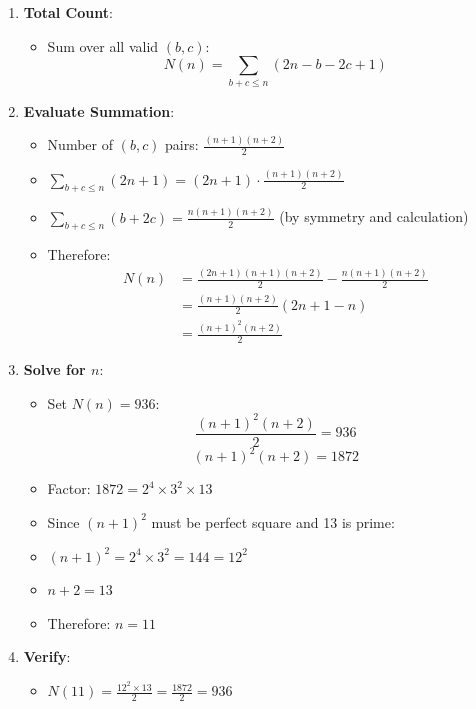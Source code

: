 \documentclass[12pt]{article}
\begin{document}
\begin{solutionbox}
\begin{enumerate}[leftmargin=*]
    \item \textbf{Total Count}: 
    \begin{itemize}
        \item Sum over all valid $(b, c)$:
        \[N(n) = \sum_{b+c \leq n} (2n - b - 2c + 1)\]
    \end{itemize}
    
    \item \textbf{Evaluate Summation}: 
    \begin{itemize}
        \item Number of $(b,c)$ pairs: $\frac{(n+1)(n+2)}{2}$
        \item $\sum_{b+c \leq n} (2n+1) = (2n+1) \cdot \frac{(n+1)(n+2)}{2}$
        \item $\sum_{b+c \leq n} (b+2c) = \frac{n(n+1)(n+2)}{2}$ (by symmetry and calculation)
        \item Therefore:
        \begin{align*}
        N(n) &= \frac{(2n+1)(n+1)(n+2)}{2} - \frac{n(n+1)(n+2)}{2}\\
        &= \frac{(n+1)(n+2)}{2}(2n+1-n)\\
        &= \frac{(n+1)^2(n+2)}{2}
        \end{align*}
    \end{itemize}
    
    \item \textbf{Solve for $n$}: 
    \begin{itemize}
        \item Set $N(n) = 936$:
        \[\frac{(n+1)^2(n+2)}{2} = 936\]
        \[(n+1)^2(n+2) = 1872\]
        \item Factor: $1872 = 2^4 \times 3^2 \times 13$
        \item Since $(n+1)^2$ must be perfect square and 13 is prime:
        \item $(n+1)^2 = 2^4 \times 3^2 = 144 = 12^2$
        \item $n+2 = 13$
        \item Therefore: $n = 11$
    \end{itemize}
    
    \item \textbf{Verify}: 
    \begin{itemize}
        \item $N(11) = \frac{12^2 \times 13}{2} = \frac{1872}{2} = 936$ \checkmark
    \end{itemize}
\end{enumerate}


\end{solutionbox}
\end{document}
